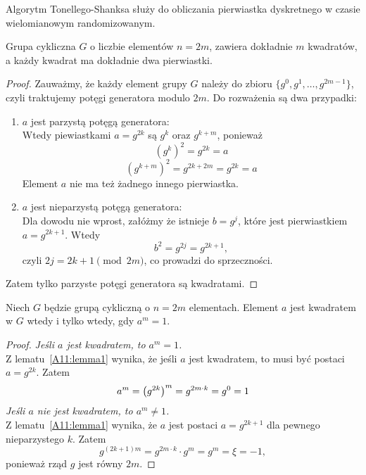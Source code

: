 Algorytm Tonellego-Shanksa służy do obliczania pierwiastka dyskretnego w czasie wielomianowym randomizowanym.

\begin{lemma}\label{A11:lemma1}
    Grupa cykliczna \( G \) o liczbie elementów \(n = 2m \), zawiera dokładnie \( m \) kwadratów, a każdy kwadrat ma dokładnie dwa pierwiastki.
\end{lemma}
\begin{proof}
    Zauważmy, że każdy element grupy \( G \) należy do zbioru \( \{g^0, g^1, \dots, g^{2m-1}\} \), czyli traktujemy potęgi generatora modulo \( 2m \). Do rozważenia są dwa przypadki:
    \begin{enumerate}
        \item \( a \) jest parzystą potęgą generatora: \\
        Wtedy piewiastkami \( a = g^{2k} \) są \( g^k \) oraz \( g^{k+m} \), ponieważ
        \[
            (g^k)^2 = g^{2k} = a
        \]
        \[
            (g^{k+m})^2 = g^{2k+2m} = g^{2k} = a
        \]
        Element \( a \) nie ma też żadnego innego pierwiastka.
        \item \( a \) jest nieparzystą potęgą generatora: \\
        Dla dowodu nie wprost, załóżmy że istnieje \( b = g^j \), które jest pierwiastkiem \( a = g^{2k+1} \). Wtedy
        \[
            b^2 = g^{2j} = g^{2k + 1},
        \]
        czyli \( 2j = 2k + 1 \pmod{2m} \), co prowadzi do sprzeczności.
    \end{enumerate}
    Zatem tylko parzyste potęgi generatora są kwadratami.
\end{proof}

\newpage
\begin{lemma}\label{A11:lemma2}
    Niech \( G \) będzie grupą cykliczną o \( n = 2m \) elementach. Element \( a \) jest kwadratem w \( G \) wtedy i tylko wtedy, gdy \( a^m = 1 \).
\end{lemma}
\begin{proof}
    \textit{Jeśli \( a \) jest kwadratem, to \( a^m = 1\).} \\
    Z lematu~\ref{A11:lemma1} wynika, że jeśli \( a \) jest kwadratem, to musi być postaci \( a = g^{2k} \). Zatem
    \[
        a^m = \left(g^{2k}\right)^m = g^{2m \cdot k} = g^0 = 1
    \]
    \textit{Jeśli \( a \) nie jest kwadratem, to \( a^m \neq 1\).} \\
    Z lematu~\ref{A11:lemma1} wynika, że \( a \) jest postaci \( a = g^{2k+1} \) dla pewnego nieparzystego \( k \). Zatem
    \[
        g^{(2k+1)m} = g^{2m \cdot k} \cdot g^m = g^m = \xi = -1,
    \]
    ponieważ rząd \( g \) jest równy \( 2m \).
\end{proof}

